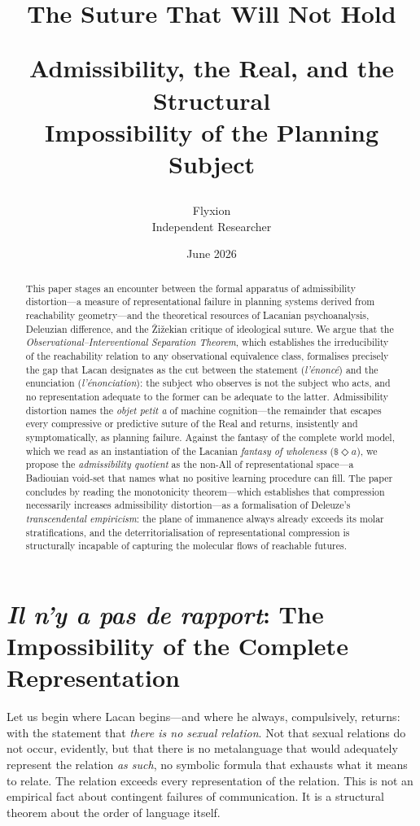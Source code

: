 \documentclass[10pt,a4paper]{article}
\title{
\textbf{The Suture That Will Not Hold}

\vspace{0.3em}

{\large
Admissibility, the Real, and the Structural\\
Impossibility of the Planning Subject
}
}
\author{Flyxion\\
  \small Independent Researcher}
\date{June 2026}
\begin{document}
\maketitle

\begin{abstract}
\noindent
This paper stages an encounter between the formal apparatus of admissibility
distortion---a measure of representational failure in planning systems derived
from reachability geometry---and the theoretical resources of Lacanian
psychoanalysis, Deleuzian difference, and the Žižekian critique of ideological
suture. We argue that the \emph{Observational--Interventional Separation Theorem},
which establishes the irreducibility of the reachability relation to any
observational equivalence class, formalises precisely the gap that Lacan
designates as the cut between the statement (\emph{l'énoncé}) and the enunciation
(\emph{l'énonciation}): the subject who observes is not the subject who acts, and
no representation adequate to the former can be adequate to the latter. Admissibility
distortion names the \emph{objet petit a} of machine cognition---the remainder
that escapes every compressive or predictive suture of the Real and returns,
insistently and symptomatically, as planning failure. Against the fantasy
of the complete world model, which we read as an instantiation of the Lacanian
\emph{fantasy of wholeness} ($\$ \Diamond a$), we propose the
\emph{admissibility quotient} as the non-All of representational space---a
Badiouian void-set that names what no positive learning procedure can fill.
The paper concludes by reading the monotonicity theorem---which establishes that
compression necessarily increases admissibility distortion---as a formalisation
of Deleuze's \emph{transcendental empiricism}: the plane of immanence always
already exceeds its molar stratifications, and the deterritorialisation of
representational compression is structurally incapable of capturing the
molecular flows of reachable futures.
\end{abstract}

\newpage

\section{\emph{Il n'y a pas de rapport}: The Impossibility of the
Complete Representation}

Let us begin where Lacan begins---and where he always, compulsively, returns:
with the statement that \emph{there is no sexual relation}. Not that sexual
relations do not occur, evidently, but that there is no metalanguage that would
adequately represent the relation \emph{as such}, no symbolic formula that
exhausts what it means to relate. The relation exceeds every representation of
the relation. This is not an empirical fact about contingent failures of
communication. It is a structural theorem about the order of language itself.
\end{document}
